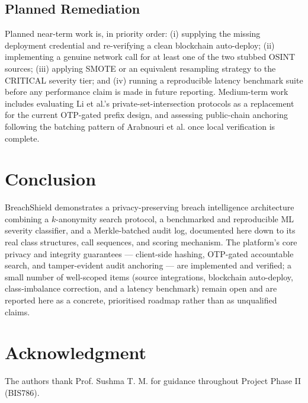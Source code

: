 \documentclass[conference]{IEEEtran}
\begin{document}
\subsection{Planned Remediation}
Planned near-term work is, in priority order: (i) supplying the missing deployment credential and re-verifying a clean blockchain auto-deploy; (ii) implementing a genuine network call for at least one of the two stubbed OSINT sources; (iii) applying SMOTE or an equivalent resampling strategy to the CRITICAL severity tier; and (iv) running a reproducible latency benchmark suite before any performance claim is made in future reporting. Medium-term work includes evaluating Li et al.'s private-set-intersection protocols \cite{li2019protocols} as a replacement for the current OTP-gated prefix design, and assessing public-chain anchoring following the batching pattern of Arabnouri et al. \cite{arabnouri2024secure} once local verification is complete.

\section{Conclusion}
BreachShield demonstrates a privacy-preserving breach intelligence architecture combining a $k$-anonymity search protocol, a benchmarked and reproducible ML severity classifier, and a Merkle-batched audit log, documented here down to its real class structures, call sequences, and scoring mechanism. The platform's core privacy and integrity guarantees --- client-side hashing, OTP-gated accountable search, and tamper-evident audit anchoring --- are implemented and verified; a small number of well-scoped items (source integrations, blockchain auto-deploy, class-imbalance correction, and a latency benchmark) remain open and are reported here as a concrete, prioritised roadmap rather than as unqualified claims.

\section*{Acknowledgment}
The authors thank Prof. Sushma T. M. for guidance throughout Project Phase II (BIS786).
\end{document}
